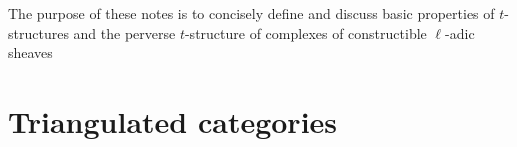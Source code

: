 The purpose of these notes is to concisely define and discuss basic properties of $t$-structures and the perverse $t$-structure of complexes of constructible $\ell$-adic sheaves

\section{Triangulated categories}















